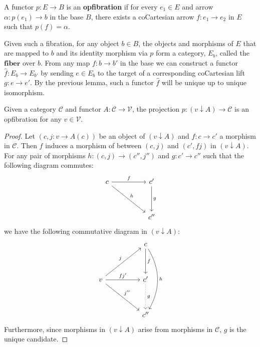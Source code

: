\begin{defn}[Opfibration]
A functor $p : E \to B$ is an \textbf{opfibration} if for every $e_1 \in E$ and arrow $\alpha : p(e_1) \to b$ in the base $B$, there exists a coCartesian arrow $f : e_1 \to e_2$ in $E$ such that $p(f) = \alpha$.
\end{defn}
Given such a fibration, for any object $b \in B$, the objects and morphisms of $E$ that are mapped to $b$ and its identity morphism via $p$ form a category, $E_b$, called the $\textbf{fiber}$ over $b$. From any map $f : b \to b'$ in the base we can construct a functor $\hat f : E_b \to E_{b'}$ by sending $e \in E_b$ to the target of a corresponding coCartesian lift $g : e \to e'$. By the previous lemma, such a functor $\hat f$ will be unique up to unique isomorphism.
\begin{thm}
Given a category $\mathcal{C}$ and functor $A : \mathcal{C} \to \mathcal{V}$, the projection $p : (v \downarrow A) \to \mathcal{C}$ is an opfibration for any $v \in \mathcal{V}$.
\begin{proof}
Let $(c, j: v \to A(c))$ be an object of $(v \downarrow A)$ and $f: c \to c'$ a morphism in $\mathcal{C}$. Then $f$ induces a morphism of between $(c, j)$ and $(c', fj)$ in $(v \downarrow A)$. For any pair of morphisms $h : (c, j) \to (c'', j'')$ and $g : c' \to c''$ such that the following diagram commutes:
\[
\ti
c \ar[r, "f"] \ar[rd, "h"] & c' \ar[d, "g"]\\
& c''
\kz
\]
we have the following commutative diagram in $(v \downarrow A)$:
\[
\ti
& c \ar[d, "f"] \ar[dd, "h", bend left]\\
v \ar[ru, "j"] \ar[rd, "j''"] \ar[r, "f j'"]& c' \ar[d, dotted, "g"]\\
& c''
\kz
\]
Furthermore, since morphisms in $(v \downarrow A)$ arise from morphisms in $\mathcal{C}$, $g$ is the unique candidate.
\end{proof}
\end{thm}
